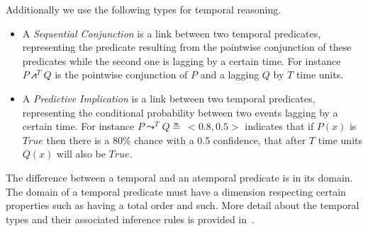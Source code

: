 \documentclass[runningheads]{llncs}
\newcommand{\lpreimp}[1]{\leadsto^{#1}}
\newcommand{\lseqand}[1]{\bigslopedwedge^{#1}}
\begin{document}
Additionally we use the following types for temporal reasoning.
\begin{itemize}
\item A \emph{Sequential Conjunction} is a link between two temporal
  predicates, representing the predicate resulting from the pointwise
  conjunction of these predicates while the second one is lagging by a
  certain time.  For instance $P \lseqand{T} Q$ is the pointwise
  conjunction of $P$ and a lagging $Q$ by $T$ time units.
\item A \emph{Predictive Implication} is a link between two temporal
  predicates, representing the conditional probability between two
  events lagging by a certain time.  For instance
  $P \lpreimp{T} Q \measeq\ <\!0.8, 0.5\!>$ indicates that if $P(x)$
  is $\textit{True}$ then there is a 80\% chance with a 0.5
  confidence, that after $T$ time units $Q(x)$ will also be
  $\textit{True}$.
\end{itemize}
The difference between a temporal and an atemporal predicate is in its
domain.  The domain of a temporal predicate must have a dimension
respecting certain properties such as having a total order and such.
More detail about the temporal types and their associated inference
rules is provided in~\cite{Geisweiller2023TPLN}.

\end{document}
